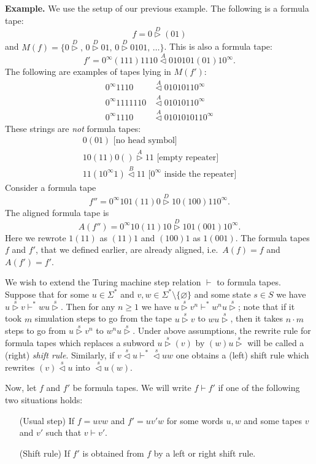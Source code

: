 \documentclass{article}
\newcommand{\lhead}[1]{\stackrel{#1}\triangleleft}
\newcommand{\rhead}[1]{\stackrel{#1}\triangleright}
\begin{document}
\noindent\textbf{Example.} We use the setup of our previous example. The following is a formula tape:
\[ f = 0 \rhead{D} (01) \]
and \( M(f) = \{ 0 \rhead{D},\, 0 \rhead{D} 01,\, 0 \rhead{D} 0101,\, \dots \} \). This is also a formula tape:
\[ f' = 0^\infty (111) 1110 \lhead{A} 010101 (01) 1 0^\infty. \]
The following are examples of tapes lying in \( M(f') \):
\begin{align*}
	0^\infty 1110 &\lhead{A} 010101 1 0^\infty\\
	0^\infty 1111110 &\lhead{A} 010101 1 0^\infty\\
	0^\infty 1110 &\lhead{A} 01010101 1 0^\infty
\end{align*}
These strings are \emph{not} formula tapes:
\begin{align*}
	0 (01)\,\, \text{[no head symbol]}\\
	10 (11) 0 () \rhead{A} 11\,\, \text{[empty repeater]}\\
	11 (1 0^\infty 1) \lhead{B} 11\,\, [0^\infty \text{ inside the repeater]}
\end{align*}
Consider a formula tape
\[ f'' = 0^\infty 101(11)0 \rhead{D} 10(100)11 0^\infty. \]
The aligned formula tape is
\[ A(f'') = 0^\infty 10(11)10 \rhead{D} 101(001)1 0^\infty. \]
Here we rewrote \( 1(11) \) as \( (11)1 \) and \( (100)1 \) as \( 1(001) \).
The formula tapes \( f \) and \( f' \), that we defined earlier, are already aligned, i.e.\ \( A(f) = f \) and \( A(f') = f' \). 
\medskip

We wish to extend the Turing machine step relation \( \vdash \) to formula tapes. Suppose that for some \( u \in \Sigma^* \) and \( v, w \in \Sigma^* \setminus \{ \varnothing \} \)
and some state \( s \in S \) we have \( u \rhead{s} v \vdash^* w u \rhead{s} \). Then for any \( n \geq 1 \) we have \( u \rhead{s} v^n \vdash^* w^n u \rhead{s} \);
note that if it took \( m \) simulation steps to go from the tape \( u \rhead{s} v \) to \( w u \rhead{s} \), then it takes \( n \cdot m \) steps
to go from \( u \rhead{s} v^n \) to \( w^n u \rhead{s} \). Under above assumptions, the rewrite rule for formula tapes which replaces a subword
\( u \rhead{s} (v) \) by \( (w) u \rhead{s} \) will be called a (right) \emph{shift rule}. Similarly, if \( v \lhead{s} u \vdash^* \lhead{s} u w \)
one obtains a (left) shift rule which rewrites \( (v) \lhead{s} u \) into \( \lhead{s} u (w) \).

Now, let \( f \) and \( f' \) be formula tapes. We will write \( f \vdash f' \) if one of the following two situations holds:
\begin{enumerate}
	\item[(Usual step)] If \( f = u v w \) and \( f' = u v' w \) for some words \( u, w \) and some tapes \( v \) and \( v' \) such that \( v \vdash v' \). 
	\item[(Shift rule)] If \( f' \) is obtained from \( f \) by a left or right shift rule.
\end{enumerate}
\end{document}
